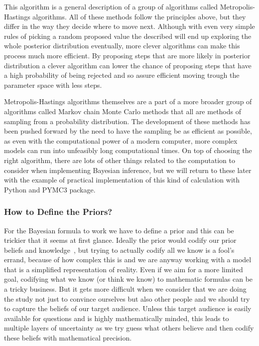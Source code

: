 \documentclass[12pt,a4paper,leqno]{report}
\theoremstyle{plain}
\theoremstyle{definition}
\theoremstyle{remark}
\begin{document}
This algorithm is a general description of a group of algorithms called
Metropolis-Hastings algorithms. All of these methods follow the principles
above, but they differ in the way they decide where to move next. Although with
even very simple rules of picking a random proposed value the described will end
up exploring the whole posterior distribution eventually, more clever algorithms
can make this process much more efficient. By proposing steps that are more
likely in posterior distribution a clever algorithm can lower the chance of
proposing steps that have a high probability of being rejected and so assure
efficient moving trough the parameter space with less steps.

Metropolis-Hastings algorithms themselves are a part of a more broader group of
algorithms called Markov chain Monte Carlo methods that all are methods of
sampling from a probability distribution. The development of these methods has
been pushed forward by the need to have the sampling be as efficient as
possible, as even with the computational power of a modern computer, more complex
models can run into unfeasibly long computational times. On top of choosing the
right algorithm, there are lots of other things related to the computation to
consider when implementing Bayesian inference, but we will return to these later
with the example of practical implementation of this kind of calculation with
Python and PYMC3 package.

\subsubsection{How to Define the Priors?}\label{bayesproblems}

For the Bayesian formula to work we have to define a prior and this can be
trickier that it seems at first glance. Ideally the prior would codify our prior
beliefs and knowledge\ \cite{gelman, kruschke}, but trying to actually codify all we
know is a fool's errand, because of how complex this is and we are
anyway working with a model that is a simplified representation of reality. Even if
we aim for a more limited goal, codifying what we know (or think we know)
to mathematic formulas can be a tricky business. But it gets more
difficult when we consider that we are doing the study not just to convince ourselves
but also other people and we should try to capture the beliefs of our target audience.
Unless this target audience is easily available for questions and is highly mathematically minded,
this leads to multiple layers of uncertainty as we try guess what others
believe and then codify these beliefs with mathematical precision.
\end{document}

